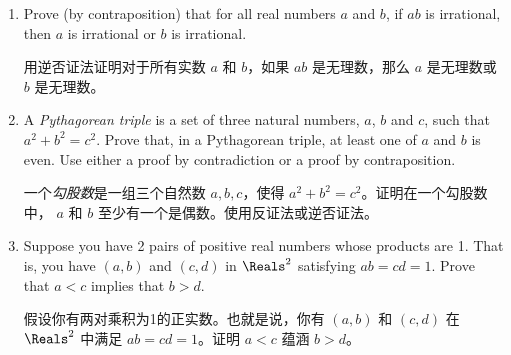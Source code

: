 \begin{enumerate}
  \item Prove (by contraposition) that for all real numbers $a$ and $b$, if $ab$ is irrational, then $a$
  is irrational or $b$ is irrational.
  
  用逆否证法证明对于所有实数 $a$ 和 $b$，如果 $ab$ 是无理数，那么 $a$ 是无理数或 $b$ 是无理数。
  
  \wbvfill
  
  
  
  \item A \emph{Pythagorean triple} is a set of three
  natural numbers, $a$, $b$ and $c$, such that $a^2 + b^2 = c^2$.
  Prove that, in a
  Pythagorean triple, at least one of $a$ and $b$ is even.
  Use either a proof by
  contradiction or a proof by contraposition.
  
  一个\emph{勾股数}是一组三个自然数 $a, b, c$，使得 $a^2 + b^2 = c^2$。证明在一个勾股数中， $a$ 和 $b$ 至少有一个是偶数。使用反证法或逆否证法。
  
  \wbvfill
  
  \workbookpagebreak
  
  \item Suppose you have 2 pairs of positive real numbers whose products are 1.  That is, you have $(a,b)$ and $(c,d)$ in $\Reals^2$ satisfying $ab=cd=1$.
  Prove that
  $a < c$ implies that $b > d$.
  
  假设你有两对乘积为1的正实数。也就是说，你有 $(a,b)$ 和 $(c,d)$ 在 $\Reals^2$ 中满足 $ab=cd=1$。证明 $a < c$ 蕴涵 $b > d$。
  
    
    \wbvfill
    
    \workbookpagebreak
    
  \end{enumerate}